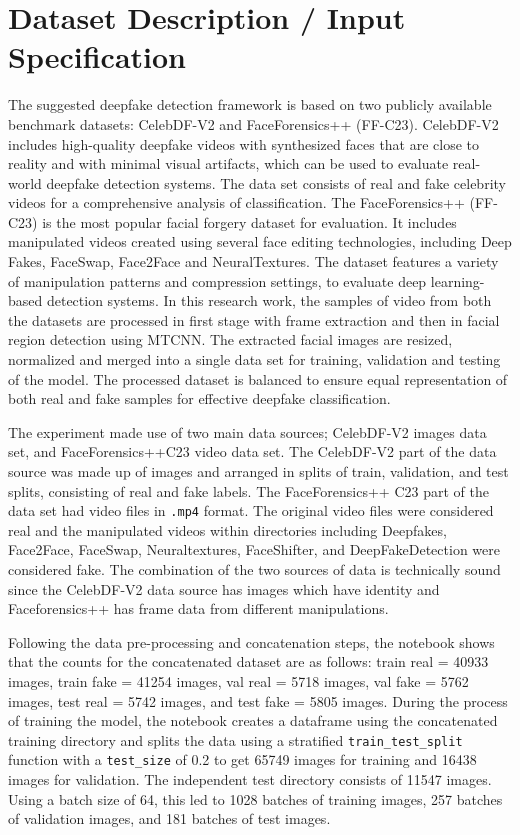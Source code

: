 \documentclass[12pt,a4paper]{report}
\begin{document}
\section{Dataset Description / Input Specification}
The suggested deepfake detection framework is based on two publicly available benchmark datasets: CelebDF-V2 and FaceForensics++ (FF-C23). CelebDF-V2 includes high-quality deepfake videos with synthesized faces that are close to reality and with minimal visual artifacts, which can be used to evaluate real-world deepfake detection systems. The data set consists of real and fake celebrity videos for a comprehensive analysis of classification. The FaceForensics++ (FF-C23) is the most popular facial forgery dataset for evaluation. It includes manipulated videos created using several face editing technologies, including Deep Fakes, FaceSwap, Face2Face and NeuralTextures. The dataset features a variety of manipulation patterns and compression settings, to evaluate deep learning-based detection systems. In this research work, the samples of video from both the datasets are processed in first stage with frame extraction and then in facial region detection using MTCNN. The extracted facial images are resized, normalized and merged into a single data set for training, validation and testing of the model. The processed dataset is balanced to ensure equal representation of both real and fake samples for effective deepfake classification.

The experiment made use of two main data sources; CelebDF-V2 images data set, and FaceForensics++C23 video data set. The CelebDF-V2 part of the data source was made up of images and arranged in splits of train, validation, and test splits, consisting of real and fake labels. The FaceForensics++ C23 part of the data set had video files in \texttt{.mp4} format. The original video files were considered real and the manipulated videos within directories including Deepfakes, Face2Face, FaceSwap, Neuraltextures, FaceShifter, and DeepFakeDetection were considered fake. The combination of the two sources of data is technically sound since the CelebDF-V2 data source has images which have identity and Faceforensics++ has frame data from different manipulations.

Following the data pre-processing and concatenation steps, the notebook shows that the counts for the concatenated dataset are as follows: train real = 40933 images, train fake = 41254 images, val real = 5718 images, val fake = 5762 images, test real = 5742 images, and test fake = 5805 images. During the process of training the model, the notebook creates a dataframe using the concatenated training directory and splits the data using a stratified \texttt{train\_test\_split} function with a \texttt{test\_size} of 0.2 to get 65749 images for training and 16438 images for validation. The independent test directory consists of 11547 images. Using a batch size of 64, this led to 1028 batches of training images, 257 batches of validation images, and 181 batches of test images.
\end{document}
